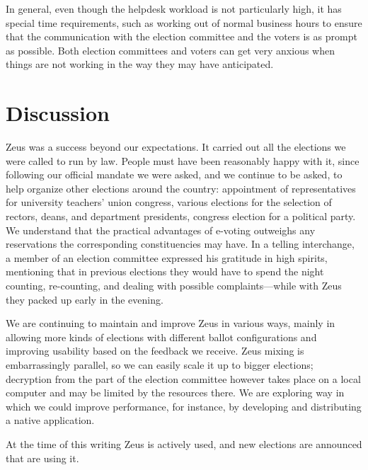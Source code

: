 \documentclass[letterpaper,10pt]{article}
\begin{document}
In general, even though the helpdesk workload is not particularly
high, it has special time requirements, such as working out of normal
business hours to ensure that the communication with the election
committee and the voters is as prompt as possible. Both election
committees and voters can get very anxious when things are not working
in the way they may have anticipated.



\section{Discussion}

Zeus was a success beyond our expectations. It carried out all the
elections we were called to run by law. People must have been
reasonably happy with it, since following our official mandate we were
asked, and we continue to be asked, to help organize other elections
around the country: appointment of representatives for university
teachers' union congress, various elections for the selection of
rectors, deans, and department presidents, congress election for a
political party. We understand that the practical advantages of
e-voting outweighs any reservations the corresponding constituencies
may have. In a telling interchange, a member of an election committee
expressed his gratitude in high spirits, mentioning that in previous
elections they would have to spend the night counting, re-counting,
and dealing with possible complaints---while with Zeus they packed up
early in the evening.

We are continuing to maintain and improve Zeus in various ways, mainly
in allowing more kinds of elections with different ballot
configurations and improving usability based on the feedback we
receive. Zeus mixing is embarrassingly parallel, so we can easily scale
it up to bigger elections; decryption from the part of the election
committee however takes place on a local computer and may be limited
by the resources there. We are exploring way in which we could improve
performance, for instance, by developing and distributing a native
application.

At the time of this writing Zeus is actively used, and new elections
are announced that are using it. 
\end{document}
